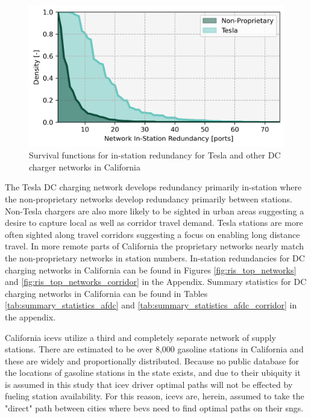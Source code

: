 \begin{multicols}{2}
\begin{figure}[H]
	\centering
	\includegraphics[width = \linewidth]{figs/California_RIS_Hist.png}
	\caption{Survival functions for in-station redundancy for Tesla and other DC charger networks in California}
	\label{fig:network_histograms}
\end{figure}

The Tesla DC charging network develops redundancy primarily in-station where the non-proprietary networks develop redundancy primarily between stations. Non-Tesla chargers are also more likely to be sighted in urban areas suggesting a desire to capture local as well as corridor travel demand. Tesla stations are more often sighted along travel corridors suggesting a focus on enabling long distance travel. In more remote parts of California the proprietary networks nearly match the non-proprietary networks in station numbers. In-station redundancies for DC charging networks in California can be found in Figures \ref{fig:ris_top_networks} and \ref{fig:ris_top_networks_corridor} in the Appendix. Summary statistics for DC charging networks in California can be found in Tables \ref{tab:summary_statistics_afdc} and \ref{tab:summary_statistics_afdc_corridor} in the appendix.

California \glspl{icev} utilize a third and completely separate network of supply stations. There are estimated to be over 8,000 gasoline stations in California \cite{CEC_2022} and these are widely and proportionally distributed. Because no public database for the locations of gasoline stations in the state exists, and due to their ubiquity it is assumed in this study that \gls{icev} driver optimal paths will not be effected by fueling station availability. For this reason, \glspl{icev} are, herein, assumed to take the "direct" path between cities where \glspl{bev} need to find optimal paths on their \glspl{sng}.


\end{multicols}
